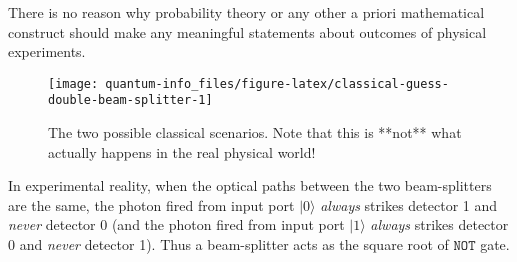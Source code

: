 \documentclass{article}
\newenvironment{idea}%
{\bigskip\noindent\begin{minipage}{\textwidth}\smallskip\begin{tcolorbox}[colback=gray!10,boxrule=0.01mm]}%
{\end{tcolorbox}\end{minipage}\bigskip}
\begin{document}
\begin{idea}

There is no reason why probability theory or any other a priori mathematical construct should make any meaningful statements about outcomes of physical experiments.

\end{idea}

\begin{figure}[H]

{\centering \texttt{[image: quantum-info\_files/figure-latex/classical-guess-double-beam-splitter-1]} 

}

\caption{The two possible classical scenarios. Note that this is **not** what actually happens in the real physical world!}\label{fig:classical-guess-double-beam-splitter}
\end{figure}

In experimental reality, when the optical paths between the two beam-splitters are the same, the photon fired from input port \(|0\rangle\) \emph{always} strikes detector 1 and \emph{never} detector 0 (and the photon fired from input port \(|1\rangle\) \emph{always} strikes detector 0 and \emph{never} detector 1).
Thus a beam-splitter acts as the square root of \(\texttt{NOT}\) gate.
\end{document}
